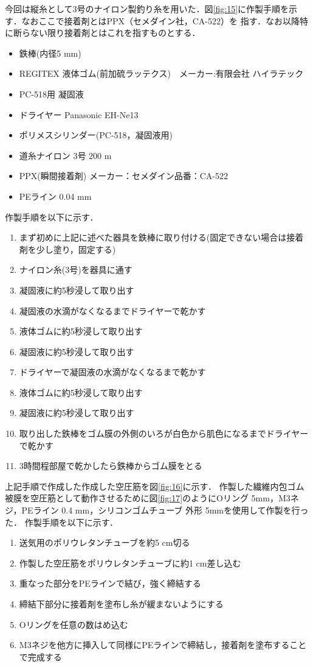 今回は縦糸として3号のナイロン製釣り糸を用いた．図\ref{fig:15}に作製手順を示す．なおここで接着剤とはPPX（セメダイン社，CA-522）を
指す．なお以降特に断らない限り接着剤とはこれを指すものとする．
\begin{itemize}
  \item 鉄棒(内径5 mm)
  \item REGITEX 液体ゴム(前加硫ラッテクス)　メーカー:有限会社 ハイラテック
  \item PC-518用 凝固液
  \item ドライヤー Panasonic EH-Ne13
  \item ポリメスシリンダー(PC-518，凝固液用)
  \item 道糸ナイロン 3号 200 m
  \item PPX(瞬間接着剤) メーカー：セメダイン品番：CA-522
  \item PEライン 0.04 mm
\end{itemize}
作製手順を以下に示す．
\begin{enumerate}
  \item まず初めに上記に述べた器具を鉄棒に取り付ける(固定できない場合は接着剤を少し塗り，固定する)
  \item ナイロン糸(3号)を器具に通す
  \item 凝固液に約5秒浸して取り出す
  \item 凝固液の水滴がなくなるまでドライヤーで乾かす
  \item 液体ゴムに約5秒浸して取り出す
  \item 凝固液に約5秒浸して取り出す
  \item ドライヤーで凝固液の水滴がなくなるまで乾かす
  \item 液体ゴムに約5秒浸して取り出す
  \item 凝固液に約5秒浸して取り出す
  \item 取り出した鉄棒をゴム膜の外側のいろが白色から肌色になるまでドライヤーで乾かす
  \item 3時間程部屋で乾かしたら鉄棒からゴム膜をとる
\end{enumerate}

上記手順で作成した作成した空圧筋を図\ref{fig:16}に示す．
作製した繊維内包ゴム被膜を空圧筋として動作させるために図\ref{fig:17}のようにOリング 5mm，M3ネジ，PEライン 0.4 mm，シリコンゴムチューブ 外形 5mmを使用して作製を行った．
作製手順を以下に示す．
\begin{enumerate}
  \item 送気用のポリウレタンチューブを約5 cm切る
  \item 作製した空圧筋をポリウレタンチューブに約1 cm差し込む
  \item 重なった部分をPEラインで結び，強く締結する
  \item 締結下部分に接着剤を塗布し糸が緩まないようにする
  \item Oリングを任意の数はめ込む
  \item M3ネジを他方に挿入して同様にPEラインで締結し，接着剤を塗布することで完成する
\end{enumerate}
